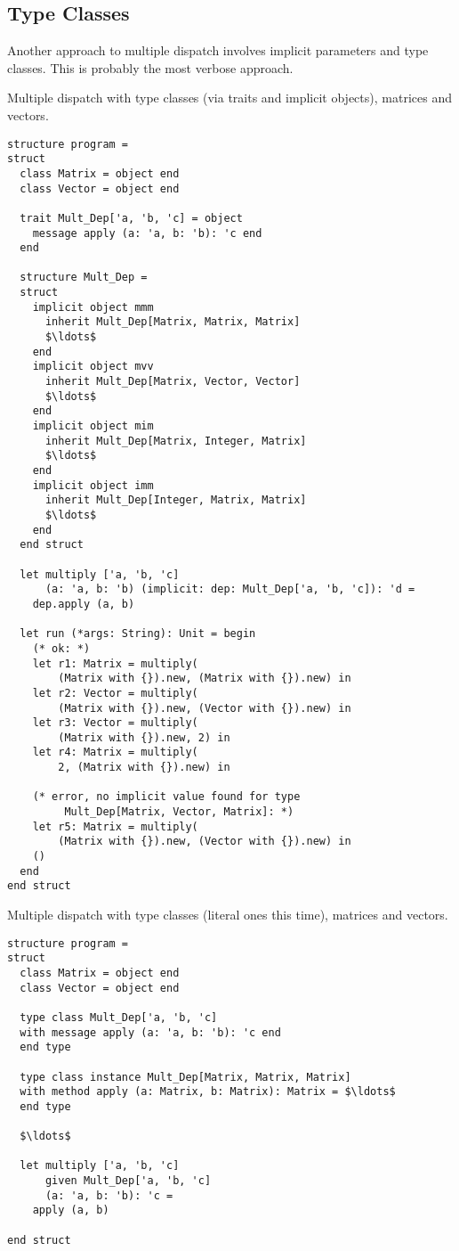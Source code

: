 \subsection{Type Classes}

Another approach to multiple dispatch involves implicit parameters and type classes. This is probably the most verbose approach. 

\example Multiple dispatch with type classes (via traits and implicit objects), matrices and vectors. 
\begin{lstlisting}
structure program =
struct
  class Matrix = object end
  class Vector = object end
  
  trait Mult_Dep['a, 'b, 'c] = object
    message apply (a: 'a, b: 'b): 'c end
  end
  
  structure Mult_Dep =
  struct
    implicit object mmm 
      inherit Mult_Dep[Matrix, Matrix, Matrix] 
      $\ldots$
    end
    implicit object mvv 
      inherit Mult_Dep[Matrix, Vector, Vector] 
      $\ldots$
    end
    implicit object mim 
      inherit Mult_Dep[Matrix, Integer, Matrix] 
      $\ldots$
    end
    implicit object imm 
      inherit Mult_Dep[Integer, Matrix, Matrix] 
      $\ldots$
    end
  end struct
  
  let multiply ['a, 'b, 'c]
      (a: 'a, b: 'b) (implicit: dep: Mult_Dep['a, 'b, 'c]): 'd =
    dep.apply (a, b)
  
  let run (*args: String): Unit = begin
    (* ok: *)
    let r1: Matrix = multiply(
        (Matrix with {}).new, (Matrix with {}).new) in
    let r2: Vector = multiply(
        (Matrix with {}).new, (Vector with {}).new) in
    let r3: Vector = multiply(
        (Matrix with {}).new, 2) in
    let r4: Matrix = multiply(
        2, (Matrix with {}).new) in
    
    (* error, no implicit value found for type
         Mult_Dep[Matrix, Vector, Matrix]: *)
    let r5: Matrix = multiply(
        (Matrix with {}).new, (Vector with {}).new) in
    ()
  end
end struct
\end{lstlisting}

\example Multiple dispatch with type classes (literal ones this time), matrices and vectors. 
\begin{lstlisting}
structure program = 
struct
  class Matrix = object end
  class Vector = object end
  
  type class Mult_Dep['a, 'b, 'c] 
  with message apply (a: 'a, b: 'b): 'c end
  end type
  
  type class instance Mult_Dep[Matrix, Matrix, Matrix]
  with method apply (a: Matrix, b: Matrix): Matrix = $\ldots$
  end type 
  
  $\ldots$
  
  let multiply ['a, 'b, 'c] 
      given Mult_Dep['a, 'b, 'c] 
      (a: 'a, b: 'b): 'c =
    apply (a, b)

end struct
\end{lstlisting}





